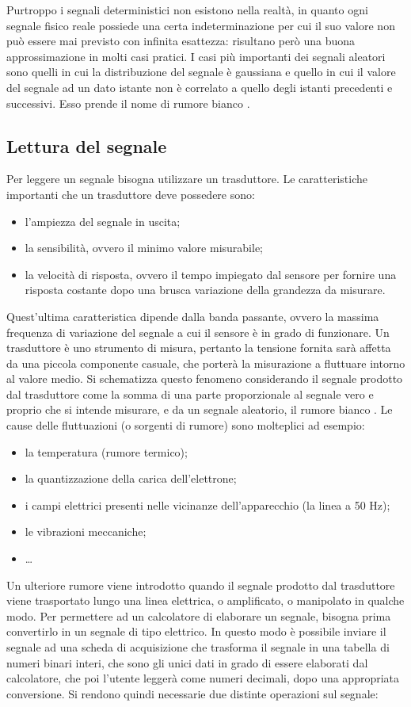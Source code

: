 \documentclass[a4paper]{report} %
\begin{document}
Purtroppo i segnali deterministici non esistono nella realtà, in quanto ogni segnale fisico reale possiede una certa indeterminazione per cui il suo valore non può essere mai previsto con infinita esattezza: risultano però una buona approssimazione in molti casi pratici.
I casi più importanti dei segnali aleatori sono quelli in cui la distribuzione del segnale è gaussiana e quello in cui il valore del segnale ad un dato istante non è correlato a quello degli istanti precedenti e successivi. Esso prende il nome di rumore bianco \cite{art:rif.2}. 

\subsection{Lettura del segnale}
Per leggere un segnale bisogna utilizzare un trasduttore. Le caratteristiche importanti che un trasduttore deve possedere sono:
\begin{itemize}
\item l'ampiezza del segnale in uscita;
\item la sensibilità, ovvero il minimo valore misurabile;
\item la velocità di risposta, ovvero il tempo impiegato dal sensore per fornire una risposta costante dopo una brusca variazione della grandezza da misurare.
\end{itemize}
Quest'ultima caratteristica dipende dalla banda passante, ovvero la massima frequenza di variazione del segnale a cui il sensore è in grado di funzionare. 
Un trasduttore è uno strumento di misura, pertanto la tensione fornita sarà affetta da una piccola componente casuale, che porterà la misurazione a fluttuare intorno al valore medio. Si schematizza questo fenomeno considerando il segnale prodotto dal trasduttore come la somma di una parte proporzionale al segnale vero e proprio che si intende misurare, e da un segnale aleatorio, il rumore bianco \cite{art:rif.2}. Le cause delle fluttuazioni (o sorgenti di rumore) sono molteplici ad esempio:
\begin{itemize}
\item la temperatura (rumore termico);
\item la quantizzazione della carica dell'elettrone;
\item i campi elettrici presenti nelle vicinanze dell'apparecchio (la linea a 50 Hz);
\item le vibrazioni meccaniche;
\item \dots
\end{itemize}
Un ulteriore rumore viene introdotto quando il segnale prodotto dal trasduttore viene trasportato lungo una linea elettrica, o amplificato, o manipolato in qualche modo. Per permettere ad un calcolatore di elaborare un segnale, bisogna prima convertirlo in un segnale di tipo elettrico. In questo modo è possibile inviare il segnale ad una scheda di acquisizione che trasforma il segnale in una tabella di numeri binari interi, che sono gli unici dati in grado di essere elaborati dal calcolatore, che poi l'utente leggerà come numeri decimali, dopo una appropriata conversione. Si rendono quindi necessarie due distinte operazioni sul segnale: 
\end{document}
